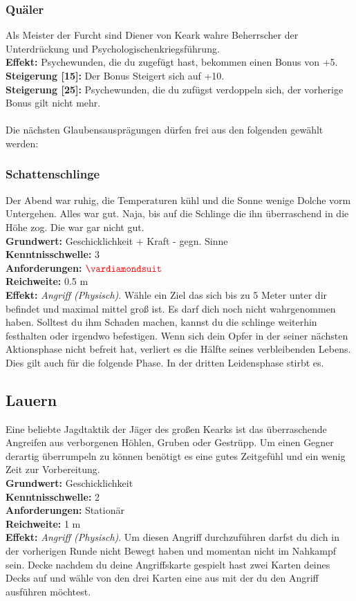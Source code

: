 \subsubsection*{Quäler} \label{sk:quaeler}
Als Meister der Furcht sind Diener von Keark wahre Beherrscher der Unterdrückung und Psychologischenkriegsführung.\\
\textbf{Effekt:} Psychewunden, die du zugefügt hast, bekommen einen Bonus von +5.\\
\textbf{Steigerung [15]:} Der Bonus Steigert sich auf +10. \\
\textbf{Steigerung [25]:} Psychewunden, die du zufügst verdoppeln sich, der vorherige Bonus gilt nicht mehr.
\\
\\
Die nächsten Glaubensausprägungen dürfen frei aus den folgenden gewählt werden:

\subsubsection*{Schattenschlinge} \label{sk:schattenklinge}
Der Abend war ruhig, die Temperaturen kühl und die Sonne wenige Dolche vorm Untergehen. Alles war gut. Naja, bis auf die Schlinge die ihn überraschend in die Höhe zog. Die war gar nicht gut.\\
\textbf{Grundwert:} Geschicklichkeit + Kraft - gegn. Sinne \\
\textbf{Kenntnisschwelle:} 3 \\
\textbf{Anforderungen:} $\Karo{}$ \\
\textbf{Reichweite:} 0.5 m \\
\textbf{Effekt:} \textit{Angriff (Physisch)}. Wähle ein Ziel das sich bis zu 5 Meter unter dir befindet und maximal mittel groß ist. Es darf dich noch nicht wahrgenommen haben. Solltest du ihm Schaden machen, kannst du die schlinge weiterhin festhalten oder irgendwo befestigen. Wenn sich dein Opfer in der seiner nächsten Aktionsphase nicht befreit hat, verliert es die Hälfte seines verbleibenden Lebens. Dies gilt auch für die folgende Phase. In der dritten Leidensphase stirbt es.

\subsection*{Lauern} \label{sk:lauern}
Eine beliebte Jagdtaktik der Jäger des großen Kearks ist das überraschende Angreifen aus verborgenen Höhlen, Gruben oder Gestrüpp. Um einen Gegner derartig überrumpeln zu können benötigt es eine gutes Zeitgefühl und ein wenig Zeit zur Vorbereitung.\\
\textbf{Grundwert:} Geschicklichkeit \\
\textbf{Kenntnisschwelle:} 2 \\
\textbf{Anforderungen:} Stationär \\
\textbf{Reichweite:} 1 m \\
\textbf{Effekt:} \textit{Angriff (Physisch)}. Um diesen Angriff durchzuführen darfst du dich in der vorherigen Runde nicht Bewegt haben und momentan nicht im Nahkampf sein. Decke nachdem du deine Angriffskarte gespielt hast zwei Karten deines Decks auf und wähle von den drei Karten eine aus mit der du den Angriff ausführen möchtest.


